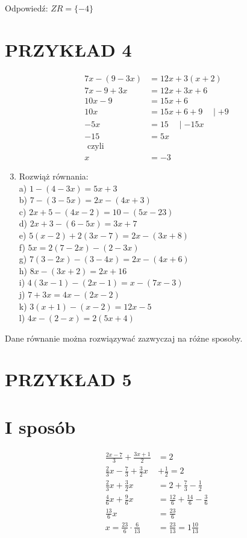 \documentclass[10pt]{article}
\begin{document}
Odpowiedź: \(Z R=\{-4\}\)

\section*{PRZYKŁAD 4}
\[
\begin{aligned}
7 x-(9-3 x) & =12 x+3(x+2) \\
7 x-9+3 x & =12 x+3 x+6 \\
10 x-9 & =15 x+6 \\
10 x & =15 x+6+9 \quad \mid+9 \\
-5 x & =15 \quad \mid-15 x \\
-15 & =5 x \\
\text { czyli } & \\
x & =-3
\end{aligned}
\]

\begin{enumerate}
  \setcounter{enumi}{2}
  \item Rozwiąż równania:\\
a) \(1-(4-3 x)=5 x+3\)\\
b) \(7-(3-5 x)=2 x-(4 x+3)\)\\
c) \(2 x+5-(4 x-2)=10-(5 x-23)\)\\
d) \(2 x+3-(6-5 x)=3 x+7\)\\
e) \(5(x-2)+2(3 x-7)=2 x-(3 x+8)\)\\
f) \(5 x=2(7-2 x)-(2-3 x)\)\\
g) \(7(3-2 x)-(3-4 x)=2 x-(4 x+6)\)\\
h) \(8 x-(3 x+2)=2 x+16\)\\
i) \(4(3 x-1)-(2 x-1)=x-(7 x-3)\)\\
j) \(7+3 x=4 x-(2 x-2)\)\\
k) \(3(x+1)-(x-2)=12 x-5\)\\
l) \(4 x-(2-x)=2(5 x+4)\)
\end{enumerate}

Dane równanie można rozwiązywać zazwyczaj na różne sposoby.

\section*{PRZYKŁAD 5}
\section*{I sposób}
\[
\begin{aligned}
\frac{2 x-7}{3}+\frac{3 x+1}{2} & =2 \\
\frac{2}{3} x-\frac{7}{3}+\frac{3}{2} x & +\frac{1}{2}=2 \\
\frac{2}{3} x+\frac{3}{2} x & =2+\frac{7}{3}-\frac{1}{2} \\
\frac{4}{6} x+\frac{9}{6} x & =\frac{12}{6}+\frac{14}{6}-\frac{3}{6} \\
\frac{13}{6} x & =\frac{23}{6} \\
x=\frac{23}{6} \cdot \frac{6}{13} & =\frac{23}{13}=1 \frac{10}{13}
\end{aligned}
\]
\end{document}
